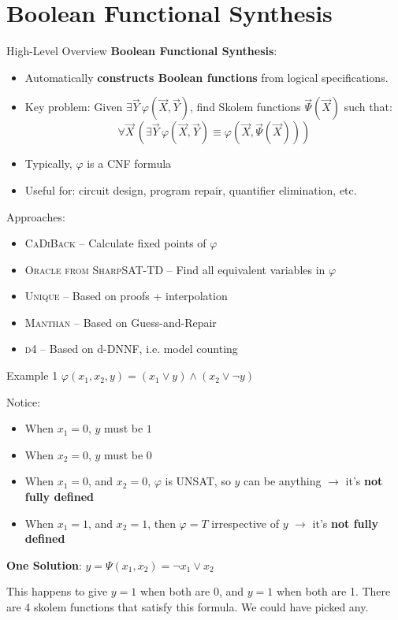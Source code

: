 \documentclass[aspectratio=169]{beamer}
\begin{document}
\section{Boolean Functional Synthesis}
\begin{frame}{High-Level Overview}
  \textbf{Boolean Functional Synthesis}:
  \begin{itemize}
    \item Automatically \textbf{constructs Boolean functions} from logical specifications.
    \item Key problem: Given \(\exists \vec{Y}\, \varphi(\vec{X}, \vec{Y})\),
        find Skolem functions \(\vec{\Psi}(\vec{X})\) such that:
        \[
            \forall \vec{X}\, \left( \exists \vec{Y}\, \varphi(\vec{X}, \vec{Y}) \equiv \varphi(\vec{X}, \vec{\Psi}(\vec{X})) \right)
        \]
    \item Typically, \(\varphi\) is a CNF formula
    \item Useful for: circuit design, program repair, quantifier elimination, etc.
\end{itemize}
\bigskip

Approaches:
\begin{itemize}
    \item \textsc{CaDiBack} -- Calculate fixed points of \(\varphi\)
    \item \textsc{Oracle from SharpSAT-TD} -- Find all equivalent variables in \(\varphi\)
    \item \textsc{Unique} -- Based on proofs + interpolation
    \item \textsc{Manthan} -- Based on Guess-and-Repair
    \item \textsc{d4} -- Based on d-DNNF, i.e. model counting
\end{itemize}
\end{frame}

\begin{frame}{Example 1}
$\varphi(x_1, x_2, y) = (x_1 \lor y) \land (x_2 \lor \neg y)$
\bigskip

Notice:
\begin{itemize}
    \item When $x_1 = 0$, $y$ must be $1$
    \item When $x_2 = 0$, $y$ must be $0$
    \item When $x_1 = 0$, and $x_2 = 0$, $\varphi$ is UNSAT, so $y$ can be anything $\rightarrow$ it's \textbf{not fully defined}
    \item When $x_1 = 1$, and $x_2 = 1$, then $\varphi = T$ irrespective of $y$ $\rightarrow$ it's \textbf{not fully defined}
\end{itemize}
\bigskip

\textbf{One Solution}: $y = \Psi(x_1, x_2) = \neg x_1 \lor x_2$
\bigskip

This happens to give $y=1$ when both are 0, and $y=1$ when both are 1. There
are 4 skolem functions that satisfy this formula. We could have picked
any.
\end{frame}
\end{document}
